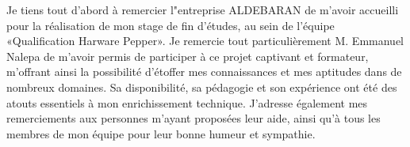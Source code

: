 Je tiens tout d’abord à remercier l"entreprise ALDEBARAN de m’avoir accueilli pour la réalisation de mon stage de fin d'études, au sein de l'équipe «Qualification Harware Pepper».
Je remercie tout particulièrement M. Emmanuel Nalepa de m'avoir permis de participer à ce projet captivant et formateur, m’offrant ainsi la possibilité d'étoffer mes connaissances et mes aptitudes dans de nombreux domaines. Sa disponibilité, sa pédagogie et son expérience ont été des atouts essentiels à mon enrichissement technique.
J’adresse également mes remerciements aux personnes m'ayant proposées leur aide, ainsi qu'à tous les membres de mon équipe pour leur bonne humeur et sympathie.